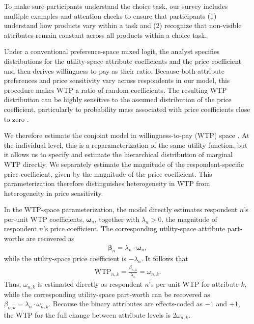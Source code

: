 \documentclass[12pt]{article}
\theoremstyle{definition}
\theoremstyle{remark}
\begin{document}
\begin{appendix}
To make sure participants understand the choice task, our survey includes multiple examples and attention checks to ensure that participants (1) understand how products vary within a task and (2) recognize that non-visible attributes remain constant across all products within a choice task.

Under a conventional preference-space mixed logit, the analyst specifies distributions for the utility-space attribute coefficients and the price coefficient and then derives willingness to pay as their ratio. Because both attribute preferences and price sensitivity vary across respondents in our model, this procedure makes WTP a ratio of random coefficients. The resulting WTP distribution can be highly sensitive to the assumed distribution of the price coefficient, particularly to probability mass associated with price coefficients close to zero \citep{daly2012assuring,helveston2023logitr}. 

We therefore estimate the conjoint model in willingness-to-pay (WTP) space \citep{train2005discrete,scarpa2008utility}. At the individual level, this is a reparameterization of the same utility function, but it allows us to specify and estimate the hierarchical distribution of marginal WTP directly. We separately estimate the magnitude of the respondent-specific price coefficient, given by the magnitude of the price coefficient. This parameterization therefore distinguishes heterogeneity in WTP from heterogeneity in price sensitivity.

In the WTP-space parameterization, the model directly estimates respondent
$n$'s per-unit WTP coefficients, $\boldsymbol{\omega}_n$, together with
$\lambda_n>0$, the magnitude of respondent $n$'s price coefficient. The
corresponding utility-space attribute part-worths are recovered as
\begin{align*}
    \boldsymbol{\beta}_n
    =
    \lambda_n \cdot \boldsymbol{\omega}_n,
\end{align*}
while the utility-space price coefficient is $-\lambda_n$. It follows that
\begin{align*}
    \mathrm{WTP}_{n,k}
    =
    \frac{\beta_{n,k}}{\lambda_n}
    =
    \omega_{n,k}.
\end{align*}
Thus, $\omega_{n,k}$ is estimated directly as respondent $n$'s per-unit WTP for attribute $k$, while the corresponding utility-space part-worth can be recovered as $\beta_{n,k}=\lambda_n\cdot\omega_{n,k}$. Because the binary attributes are effects-coded as $-1$ and $+1$, the WTP for the full change between attribute levels is $2\omega_{n,k}$.


\end{appendix}
\end{document}
